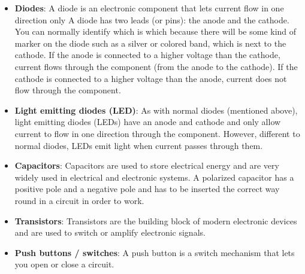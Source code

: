 \documentclass{report}
\begin{document}
\begin{itemize}
\begin{itemize}
                    \bigbreak \noindent 
                    Resistors are very cheap and when you start building circuits you will notice that you very quickly accumulate a large selection of resistors.
                    \bigbreak \noindent 
                    You should also get yourself a few variable resistors (potentiometers). With this type of resistor you can manually adjust the resistance value from a minimum to a maximum value
                    \bigbreak \noindent 
                    With an LDR (light dependent resistor), the amount of resistance provided by the resistor varies with the amount of light detected.
                    \bigbreak \noindent 
                    You could also consider getting a few thermistors. A thermistor is a resistor in which the amount of resistance provided depends on the temperature.
                \item \textbf{Diodes}: A diode is an electronic component that lets current flow in one direction only
                    \bigbreak \noindent 
                    A diode has two leads (or pins): the anode and the cathode. You can normally identify which is which because there will be some kind of marker on the diode such as a silver or colored band, which is next to the cathode.
                    \bigbreak \noindent 
                    If the anode is connected to a higher voltage than the cathode, current flows through the component (from the anode to the cathode). If the cathode is connected to a higher voltage than the anode, current does not flow through the component.
                \item \textbf{Light emitting diodes (LED)}: As with normal diodes (mentioned above), light emitting diodes (LEDs) have an anode and cathode and only allow current to flow in one direction through the component. However, different to normal diodes, LEDs emit light when current passes through them.
                \item \textbf{Capacitors}: Capacitors are used to store electrical energy and are very widely used in electrical and electronic systems.
                    \bigbreak \noindent 
                    A polarized capacitor has a positive pole and a negative pole and has to be inserted the correct way round in a circuit in order to work.
                \item \textbf{Transistors}: Transistors are the building block of modern electronic devices and are used to switch or amplify electronic signals.
                \item \textbf{Push buttons / switches}: A push button is a switch mechanism that lets you open or close a circuit.

\end{itemize}
\end{itemize}
\end{document}
